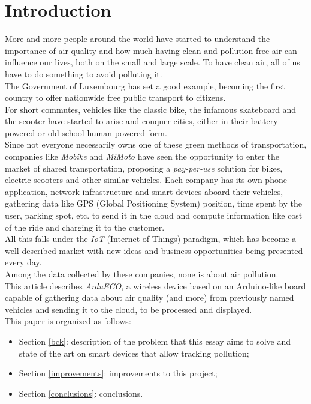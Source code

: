 \documentclass[conference]{IEEEtran}
\begin{document}
\section{Introduction}\label{intro}
	More and more people around the world have started to understand the importance of air quality and how much having clean and pollution-free air can influence our lives, both on the small and large scale. 
	To have clean air, all of us have to do something to avoid polluting it. \\
	The Government of Luxembourg has set a good example, becoming the first country to offer nationwide free public transport to citizens\cite{luxemburg}.\\
	For short commutes, vehicles like the classic bike\cite{bike}, the infamous skateboard and the scooter have started to arise and conquer cities, either in their battery-powered or old-school human-powered form.\\
	Since not everyone necessarily owns one of these green methods of transportation, companies like \textit{Mobike}\cite{mobike} and \textit{MiMoto}\cite{mimoto} have seen the opportunity to enter the market of shared transportation, proposing a \textit{pay-per-use} solution for bikes, electric scooters and other similar vehicles.	
	Each company has its own phone application, network infrastructure and smart devices aboard their vehicles, gathering data like GPS (Global Positioning System) position, time spent by the user, parking spot, etc. to send it in the cloud and compute information like cost of the ride and charging it to the customer.\\
	All this falls under the \textit{IoT} (Internet of Things) paradigm, which has become a well-described market with new ideas and business opportunities being presented every day.\\
	Among the data collected by these companies, none is about air pollution.\\
	This article describes \textit{ArduECO}, a wireless device based on an Arduino-like board capable of gathering data about air quality (and more) from previously named vehicles and sending it to the cloud, to be processed and displayed.\\
	This paper is organized as follows:
	\begin{itemize}
		\item Section \ref{bck}: description of the problem that this essay aims to solve and state of the art on smart devices that allow tracking pollution;
		\item Section \ref{improvements}: improvements to this project;
		\item Section \ref{conclusions}: conclusions.
	\end{itemize}
\end{document}

